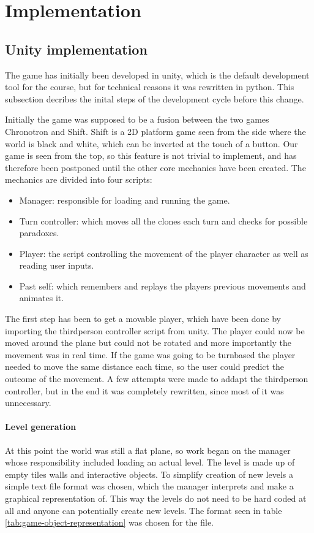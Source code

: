 \section{Implementation} 
\subsection{Unity implementation}
The game has initially been developed in unity, which is the default development
tool for the course, but for technical reasons it was rewritten in python. This
subsection decribes the inital steps of the development cycle before this change.

Initially the game was supposed to be a fusion between the two games
Chronotron and Shift. Shift is a 2D platform game seen from the side where
the world is black and white, which can be inverted at the touch of a button.
Our game is seen from the top, so this feature is not trivial to implement, and
has therefore been postponed until the other core mechanics have been created.
The mechanics are divided into four scripts:\\

\begin{itemize}
\item Manager: responsible for loading and running the game.
\item Turn controller: which moves all the clones each turn and checks for possible paradoxes.
\item Player: the script controlling the movement of the player character as well as reading user inputs.
\item Past self: which remembers and replays the players previous movements and animates it.
\end{itemize}

The first step has been to get a movable player, which have been done by importing the
thirdperson controller script from unity. The player could now be moved around
the plane but could not be rotated and more importantly the movement was in
real time. If the game was going to be turnbased the player needed to move
the same distance each time, so the user could predict the outcome of the
movement. A few attempts were made to addapt the thirdperson controller,
but in the end it was completely rewritten, since most of it was unnecessary.

\paragraph {Level generation} At this point the world was still a flat plane,
so work began on the manager whose responsibility included loading an actual
level. The level is made up of empty tiles walls and interactive objects. To
simplify creation of new levels a simple text file format was chosen, which the
manager interprets and make a graphical representation of. This way the
levels do not need to be hard coded at all and anyone can potentially create
new levels. The format seen in table \ref{tab:game-object-representation}
was chosen for the file.

